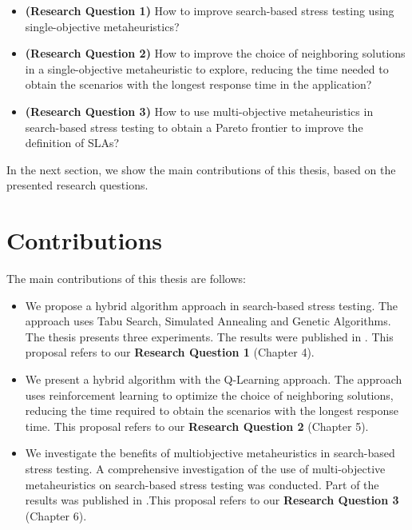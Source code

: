 \documentclass[espaco=umemeio,chapter=TITLE,twoside,openright]{abnt}
\begin{document}
\begin{itemize}

\item \textbf{(Research Question 1)}  How to improve search-based stress testing using single-objective metaheuristics?

\item \textbf{(Research Question 2)} How to improve the choice of neighboring solutions in a single-objective metaheuristic to explore, reducing the time needed to obtain the scenarios with the longest response time in the application?

\item \textbf{(Research Question 3)} How to use multi-objective metaheuristics in search-based stress testing to obtain a Pareto frontier to improve the definition of SLAs?

\end{itemize}


In the next section, we show the main contributions of this thesis, based on the presented research questions.


\section{Contributions}

The main contributions of this thesis are follows:

\begin{itemize}
\item We propose a hybrid algorithm approach in search-based stress testing. The approach uses Tabu Search, Simulated Annealing and Genetic Algorithms. The thesis presents three experiments. The results were published in  \cite{Gois2016}. This proposal refers to our \textbf{Research Question 1} (Chapter 4).
 
\item We present a hybrid algorithm with the Q-Learning approach. The approach uses reinforcement learning to optimize the choice of neighboring solutions, reducing the time required to obtain the scenarios with the longest response time. This proposal refers to our \textbf{Research Question 2} (Chapter 5).

\item  We investigate the benefits of multiobjective metaheuristics in search-based stress testing. A comprehensive investigation of the use of multi-objective metaheuristics on search-based stress testing was conducted. Part of the results was published in \cite{Gois2017}.This proposal refers to our \textbf{Research Question 3} (Chapter 6).

\end{itemize}
\end{document}
